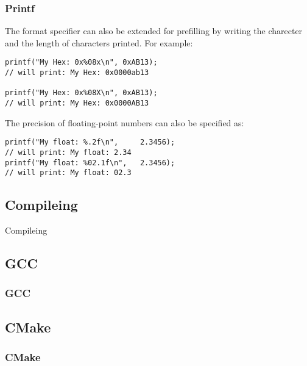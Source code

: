 \documentclass[
	11pt, %
]{beamer}
\begin{document}
\begin{frame}[fragile]
	\frametitle{Printf}

    The format specifier can also be extended for prefilling by writing the charecter and the length of characters printed.
    For example:
    \begin{lstlisting}[style=CStyle]
printf("My Hex: 0x%08x\n", 0xAB13);
// will print: My Hex: 0x0000ab13

printf("My Hex: 0x%08X\n", 0xAB13);
// will print: My Hex: 0x0000AB13

\end{lstlisting}

    \bigskip

    The precision of floating-point numbers can also be specified as:
    \begin{lstlisting}[style=CStyle]
printf("My float: %.2f\n",     2.3456);
// will print: My float: 2.34
printf("My float: %02.1f\n",   2.3456);
// will print: My float: 02.3

\end{lstlisting}

\end{frame}


\begin{frame}
    \section{Compileing}
	\begin{center}
		{\Huge Compileing}
	\end{center}
\end{frame}


\begin{frame}
    \subsection{GCC}
	\frametitle{GCC}
\end{frame}

\begin{frame}
    \subsection{CMake}
	\frametitle{CMake}
\end{frame}
\end{document}

